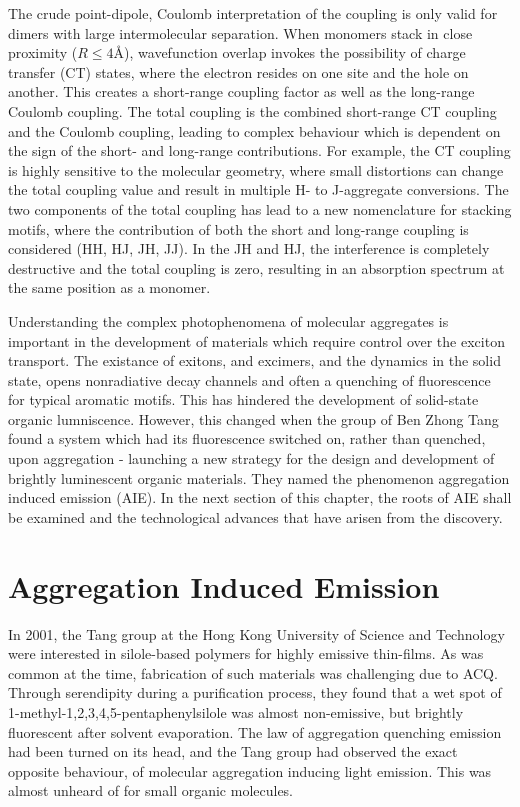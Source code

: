The crude point-dipole, Coulomb interpretation of the coupling is only valid for dimers with large intermolecular separation.\cite{Kistler2013} When monomers stack in close proximity ($R\leq4\si{\angstrom}$), wavefunction overlap invokes the possibility of charge transfer (CT) states, where the electron resides on one site and the hole on another.\cite{Darghouth2018} This creates a short-range coupling factor as well as the long-range Coulomb coupling. The total coupling is the combined short-range CT coupling and the Coulomb coupling, leading to complex behaviour which is dependent on the sign of the short- and long-range contributions. For example, the CT coupling is highly sensitive to the molecular geometry, where small distortions can change the total coupling value and result in multiple H- to J-aggregate conversions.\cite{Arago2015} The two components of the total coupling has lead to a new nomenclature for stacking motifs, where the contribution of both the short and long-range coupling is considered (HH, HJ, JH, JJ). In the JH and HJ, the interference is completely destructive and the total coupling is zero, resulting in an absorption spectrum at the same position as a monomer.\cite{Hestand2017}

Understanding the complex photophenomena of molecular aggregates is important in the development of materials which require control over the exciton transport. The existance of exitons, and excimers, and the dynamics in the solid state, opens nonradiative decay channels and often a quenching of fluorescence for typical aromatic motifs. This has hindered the development of solid-state organic lumniscence. However, this changed when the group of Ben Zhong Tang found a system which had its fluorescence switched on, rather than quenched, upon aggregation - launching a new strategy for the design and development of brightly luminescent organic materials. They named the phenomenon aggregation induced emission (AIE). In the next section of this chapter, the roots of AIE shall be examined and the technological advances that have arisen from the discovery.

\section{Aggregation Induced Emission}\label{section: lom AIE}
In 2001, the Tang group at the Hong Kong University of Science and Technology were interested in silole-based polymers for highly emissive thin-films. As was common at the time, fabrication of such materials was challenging due to ACQ. Through serendipity during a purification process, they found that a wet spot of 1-methyl-1,2,3,4,5-pentaphenylsilole was almost non-emissive, but brightly fluorescent after solvent evaporation.\cite{Luo2001} The law of aggregation quenching emission had been turned on its head, and the Tang group had observed the exact opposite behaviour, of molecular aggregation inducing light emission. This was almost unheard of for small organic molecules. 

